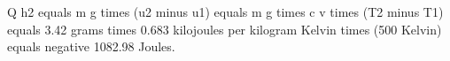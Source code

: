 Q h2 equals m g times (u2 minus u1) equals m g times c v times (T2 minus T1) equals 3.42 grams times 0.683 kilojoules per kilogram Kelvin times (500 Kelvin) equals negative 1082.98 Joules.